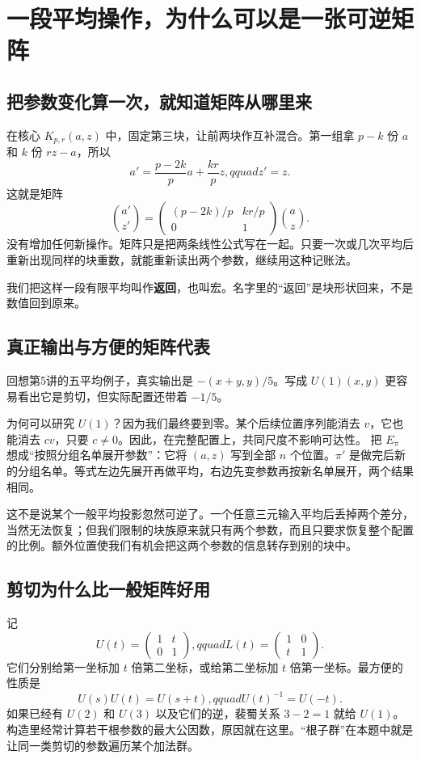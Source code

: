 \chapter{一段平均操作，为什么可以是一张可逆矩阵}\label{sec:arithmetic}
\section{把参数变化算一次，就知道矩阵从哪里来}
在核心 $K_{p,r}(a,z)$ 中，固定第三块，让前两块作互补混合。第一组拿 $p-k$ 份 $a$ 和 $k$ 份 $rz-a$，所以
\[a'=\frac{p-2k}{p}a+\frac{kr}{p}z,qquad z'=z.
\]
这就是矩阵
\[\binom{a'}{z'}=
\begin{pmatrix}(p-2k)/p&kr/p\\0&1\end{pmatrix}\binom az.
\]
没有增加任何新操作。矩阵只是把两条线性公式写在一起。只要一次或几次平均后重新出现同样的块重数，就能重新读出两个参数，继续用这种记账法。

我们把这样一段有限平均叫作\textbf{返回}，也叫宏。名字里的“返回”是块形状回来，不是数值回到原来。

\section{真正输出与方便的矩阵代表}
回想第5讲的五平均例子，真实输出是 $-(x+y,y)/5$。写成 $U(1)(x,y)$ 更容易看出它是剪切，但实际配置还带着 $-1/5$。

为何可以研究 $U(1)$？因为我们最终要到零。某个后续位置序列能消去 $v$，它也能消去 $cv$，只要 $c\ne0$。因此，在完整配置上，共同尺度不影响可达性。
把 $E_\pi$ 想成“按照分组名单展开参数”：它将 $(a,z)$ 写到全部 $n$ 个位置。$\pi'$ 是做完后新的分组名单。等式左边先展开再做平均，右边先变参数再按新名单展开，两个结果相同。

这不是说某个一般平均投影忽然可逆了。一个任意三元输入平均后丢掉两个差分，当然无法恢复；但我们限制的块族原来就只有两个参数，而且只要求恢复整个配置的比例。额外位置使我们有机会把这两个参数的信息转存到别的块中。

\section{剪切为什么比一般矩阵好用}
记
\[U(t)=\begin{pmatrix}1&t\\0&1\end{pmatrix},qquad
L(t)=\begin{pmatrix}1&0\\t&1\end{pmatrix}.
\]
它们分别给第一坐标加 $t$ 倍第二坐标，或给第二坐标加 $t$ 倍第一坐标。最方便的性质是
\[U(s)U(t)=U(s+t),qquad U(t)^{-1}=U(-t).
\]
如果已经有 $U(2)$ 和 $U(3)$ 以及它们的逆，裴蜀关系 $3-2=1$ 就给 $U(1)$。构造里经常计算若干根参数的最大公因数，原因就在这里。“根子群”在本题中就是让同一类剪切的参数遍历某个加法群。


